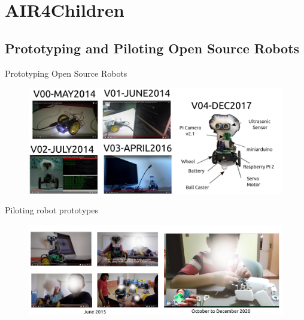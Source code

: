 \section{AIR4Children}

\subsection{Prototyping and Piloting Open Source Robots}

{
\begin{frame}{Prototyping Open Source Robots}
      \begin{figure}
        \centering
        \includegraphics[width=1.0\textwidth]{./figures/air4children-a/outputs/drawing-v00.png}
      \end{figure}
\end{frame}
}

{
\begin{frame}{Piloting robot prototypes}
      \begin{figure}
        \centering
        \includegraphics[width=1.0\textwidth]{./figures/air4children-b/outputs/drawing-v00.png}
      \end{figure}
\end{frame}
}

